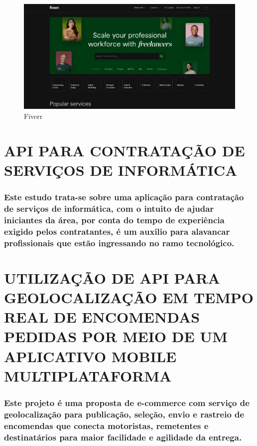 \begin{figure}
\centering
\caption{Fiverr}
\label{fig:Fiverr}
\includegraphics[scale=0.5]{Illustrations/Fiverr.jpg}
\end{figure}

\section{API PARA CONTRATAÇÃO DE SERVIÇOS DE INFORMÁTICA}
\subsubsection{Este estudo \cite{Silva2022} trata-se sobre uma aplicação para contratação de serviços de informática, com o intuito de ajudar iniciantes da área, por conta do tempo de experiência exigido pelos contratantes, é um auxilio para alavancar profissionais que estão ingressando no ramo tecnológico.}

\section{UTILIZAÇÃO DE API PARA GEOLOCALIZAÇÃO EM TEMPO REAL DE ENCOMENDAS PEDIDAS POR MEIO DE UM APLICATIVO MOBILE MULTIPLATAFORMA}
\subsubsection{Este projeto \cite{Oliveira2022} é uma proposta de e-commerce com serviço de geolocalização para publicação, seleção, envio e rastreio de encomendas que conecta motoristas, remetentes e destinatários para maior facilidade e agilidade da entrega.}


